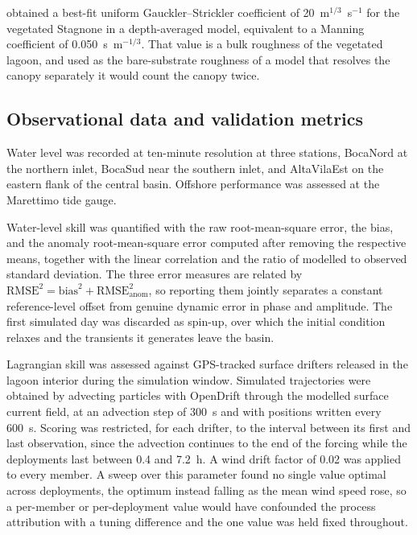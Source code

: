 \citet{Ingrassia2024} obtained a best-fit uniform Gauckler--Strickler
coefficient of 20~m$^{1/3}$~s$^{-1}$ for the vegetated Stagnone in a
depth-averaged model, equivalent to a Manning coefficient of
0.050~s~m$^{-1/3}$. That value is a bulk roughness of the vegetated lagoon, and
used as the bare-substrate roughness of a model that resolves the canopy
separately it would count the canopy twice.

\subsection{Observational data and validation metrics}
\label{sec:methods_validation}

Water level was recorded at ten-minute resolution at three stations, BocaNord
at the northern inlet, BocaSud near the southern inlet, and AltaVilaEst on the
eastern flank of the central basin. Offshore performance was assessed at the
Marettimo tide gauge.

Water-level skill was quantified with the raw root-mean-square error, the
bias, and the anomaly root-mean-square error computed after removing the
respective means, together with the linear correlation and the ratio of
modelled to observed standard deviation. The three error measures are related
by $\mathrm{RMSE}^2 = \mathrm{bias}^2 + \mathrm{RMSE}_{\mathrm{anom}}^2$, so
reporting them jointly separates a constant reference-level offset from
genuine dynamic error in phase and amplitude. The first simulated day was
discarded as spin-up, over which the initial condition relaxes and the
transients it generates leave the basin.

Lagrangian skill was assessed against GPS-tracked surface drifters released in
the lagoon interior during the simulation window. Simulated trajectories were
obtained by advecting particles with OpenDrift \citep{Dagestad2018} through the
modelled surface current field, at an advection step of 300~s and with
positions written every 600~s. Scoring was restricted, for each drifter, to
the interval between its first and last observation, since the advection
continues to the end of the forcing while the deployments last between 0.4 and
7.2~h. A wind drift factor of 0.02 was applied to every member. A sweep over
this parameter found no single value optimal across deployments, the optimum
instead falling as the mean wind speed rose, so a per-member or per-deployment
value would have confounded the process attribution with a tuning difference
and the one value was held fixed throughout.

